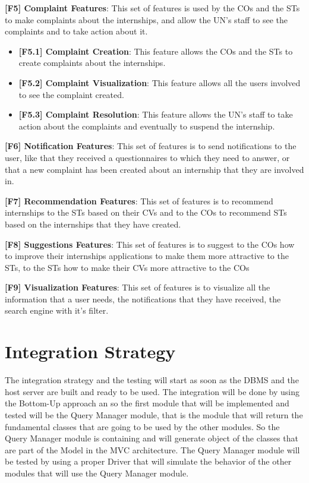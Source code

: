 \par \textbf{[F5] Complaint Features}: This set of features is used by the COs and the STs to make complaints about the
internships, and allow the UN's staff to see the complaints and to take action about it.

\begin{itemize}
    \item \textbf{[F5.1] Complaint Creation}: This feature allows the COs and the STs to create complaints about the
    internships.
    \item \textbf{[F5.2] Complaint Visualization}: This feature allows all the users involved to see the complaint 
    created.
    \item \textbf{[F5.3] Complaint Resolution}: This feature allows the UN's staff to take action about the complaints
    and eventually to suspend the internship.
\end{itemize}

\par \textbf{[F6] Notification Features}: This set of features is to send notifications to the user, like 
that they received a questionnaires to which they need to answer, or that a new complaint has been created about an internship
that they are involved in.

\par \textbf{[F7] Recommendation Features}: This set of features is to recommend internships to the STs based on their
CVs and to the COs to recommend STs based on the internships that they have created.

\par \textbf{[F8] Suggestions Features}: This set of features is to suggest to the COs how to improve their internships
applications to make them more attractive to the STs, to the STs how to make their CVs more attractive to the COs

\par \textbf{[F9] Visualization Features}: This set of features is to visualize all the information that a user needs,
the notifications that they have received, the search engine with it's filter.


\section{Integration Strategy}
\label{sec:integration-strategy}%

\par The integration strategy and the testing will start as soon as the DBMS and the host server are built and ready 
to be used. The integration will be done by using the Bottom-Up approach an so the first module that will be implemented
and tested will be the Query Manager module, that is the module that will return the fundamental classes that are going to
be used by the other modules. So the Query Manager module is containing and will generate object of the classes that are
part of the Model in the MVC architecture. The Query Manager module will be tested by using a proper Driver that will 
simulate the behavior of the other modules that will use the Query Manager module.  



